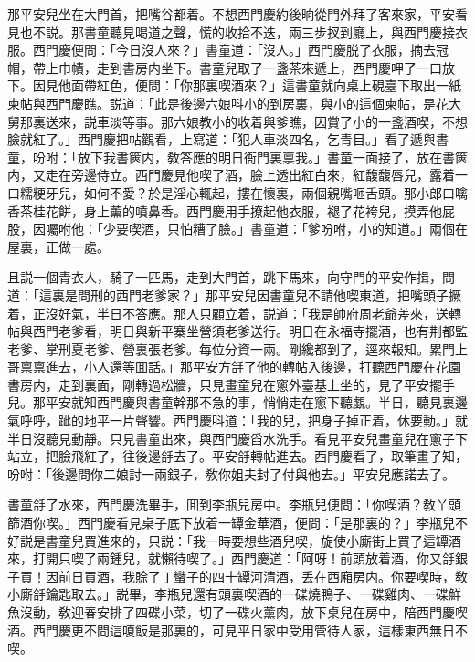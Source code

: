 那平安兒坐在大門首，把嘴谷都着。不想西門慶約後晌從門外拜了客來家，平安看見也不説。那書童聽見喝道之聲，慌的收拾不迭，兩三步扠到廳上，與西門慶接衣服。西門慶便問：「今日沒人來？」書童道：「沒人。」西門慶脱了衣服，摘去冠帽，帶上巾幘，走到書房内坐下。書童兒取了一盞茶來遞上，西門慶呷了一口放下。因見他面帶紅色，便問：「你那裏喫酒來？」這書童就向桌上硯臺下取出一紙柬帖與西門慶瞧。説道：「此是後邊六娘呌小的到房裏，與小的這個柬帖，是花大舅那裏送來，説車淡等事。那六娘教小的收着與爹瞧，因賞了小的一盞酒喫，不想臉就紅了。」西門慶把帖觀看，上寫道：「犯人車淡四名，乞青目。」看了遞與書童，吩咐：「放下我書篋内，敎答應的明日衙門裏禀我。」書童一面接了，放在書篋内，又走在旁邊侍立。西門慶見他喫了酒，臉上透出紅白來，紅馥馥唇兒，露着一口糯粳牙兒，如何不愛？於是淫心輒起，摟在懷裏，兩個親嘴咂舌頭。那小郎口噙香茶桂花餅，身上薰的噴鼻香。西門慶用手撩起他衣服，褪了花袴兒，摸弄他屁股，因囑咐他：「少要喫酒，只怕糟了臉。」書童道：「爹吩咐，小的知道。」兩個在屋裏，正做一處。

且説一個青衣人，騎了一匹馬，走到大門首，跳下馬來，向守門的平安作揖，問道：「這裏是問刑的西門老爹家？」那平安兒因書童兒不請他喫東道，把嘴頭子撅着，正沒好氣，半日不答應。那人只顧立着，説道：「我是帥府周老爺差來，送轉帖與西門老爹看，明日與新平寨坐營須老爹送行。明日在永福寺擺酒，也有荆都監老爹、掌刑夏老爹、營裏張老爹。每位分資一兩。剛纔都到了，逕來報知。累門上哥禀禀進去，小人還等囬話。」那平安方㧱了他的轉帖入後邊，打聽西門慶在花園書房内，走到裏面，剛轉過松牆，只見畫童兒在窻外臺基上坐的，見了平安擺手兒。那平安就知西門慶與書童幹那不急的事，悄悄走在窻下聽覷。半日，聽見裏邊氣呼呼，跐的地平一片聲響。西門慶呌道：「我的兒，把身子掉正着，休要動。」就半日沒聽見動靜。只見書童出來，與西門慶舀水洗手。看見平安兒畫童兒在窻子下站立，把臉飛紅了，往後邊㧱去了。平安㧱轉帖進去。西門慶看了，取筆畫了知，吩咐：「後邊問你二娘討一兩銀子，敎你姐夫封了付與他去。」平安兒應諾去了。

書童㧱了水來，西門慶洗畢手，囬到李瓶兒房中。李瓶兒便問：「你喫酒？敎丫頭篩酒你喫。」西門慶看見桌子底下放着一罈金華酒，便問：「是那裏的？」李瓶兒不好説是書童兒買進來的，只説：「我一時要想些酒兒喫，旋使小廝街上買了這罈酒來，打開只喫了兩鍾兒，就懶待喫了。」西門慶道：「阿呀！前頭放着酒，你又㧱銀子買！因前日買酒，我賒了丁蠻子的四十罈河清酒，丢在西廂房内。你要喫時，敎小廝㧱鑰匙取去。」説畢，李瓶兒還有頭裏喫酒的一碟燒鴨子、一碟雞肉、一碟鮮魚沒動，敎迎春安排了四碟小菜，切了一碟火薰肉，放下桌兒在房中，陪西門慶喫酒。西門慶更不問這嗄飯是那裏的，可見平日家中受用管待人家，這樣東西無日不喫。

